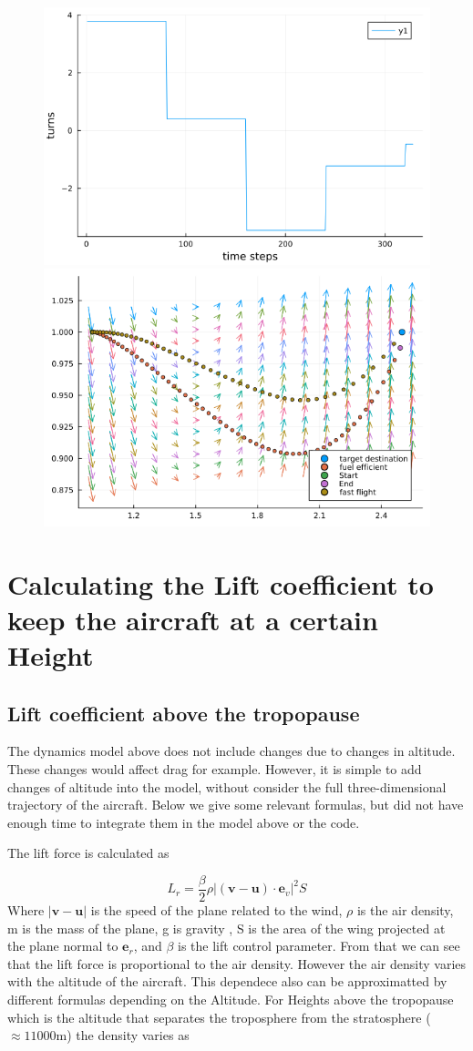 \documentclass{article}
\renewcommand{\vec}[1]{\boldsymbol{#1}}
\begin{document}
\begin{figure}
    \centering
    \includegraphics[width = 0.49\linewidth]{readme-4.png}
    \includegraphics[width = 0.49\linewidth]{readme-5.png}
\end{figure}
\section{Calculating the Lift coefficient to keep the aircraft at a certain Height}

\subsection{Lift coefficient above the tropopause}

The dynamics model above does not include changes due to changes in altitude. These changes would affect drag for example. However, it is simple to add changes of altitude into the model, without consider the full three-dimensional trajectory of the aircraft. Below we give some relevant formulas, but did not have enough time to integrate them in the model above or the code.  

The lift force is calculated as  \cite{nuic2004bada} 

\begin{equation}
    L_r= \frac{\beta }{2} \rho |(\vec{v}-\vec{u})\cdot \vec e_v|^2S
\end{equation}
Where $|\vec{v}-\vec{u}|$ is the speed of the plane related to the wind, $\rho$ is the air density, m is the mass of the plane, g is gravity , S is the area of the wing  projected at the plane normal to $\vec{e}_r$, and $\beta$ is the lift control parameter. From that we can see that the lift force is proportional to the air density. However the air density varies with the altitude of the aircraft. This dependece also can be approximatted by different formulas depending on the Altitude. For Heights above the tropopause  \cite{nuic2004bada} which is the altitude that separates the troposphere from the stratosphere ($\approx 11000$m) the density varies as
\end{document}
